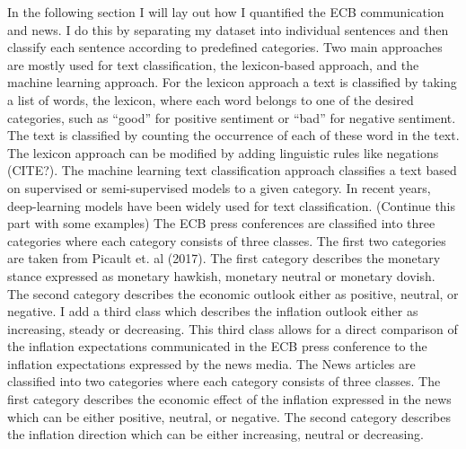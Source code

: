 \documentclass[review]{elsarticle}
\begin{document}
In the following section I will lay out how I quantified the ECB communication and news. I do this by separating my dataset into individual sentences and then classify each sentence according to predefined categories.
Two main approaches are mostly used for text classification, the lexicon-based approach, and the machine learning approach. For the lexicon approach a text is classified by taking a list of words, the lexicon, where each word belongs to one of the desired categories, such as “good” for positive sentiment or “bad” for negative sentiment. The text is classified by counting the occurrence of each of these word in the text. The lexicon approach can be modified by adding linguistic rules like negations (CITE?). 
The machine learning text classification approach classifies a text based on supervised or semi-supervised models to a given category. In recent years, deep-learning models have been widely used for text classification.
(Continue this part with some examples)
The ECB press conferences are classified into three categories where each category consists of three classes. The first two categories are taken from Picault et. al (2017). The first category describes the monetary stance expressed as monetary hawkish, monetary neutral or monetary dovish. The second category describes the economic outlook either as positive, neutral, or negative. I add a third class which describes the inflation outlook either as increasing, steady or decreasing. This third class allows for a direct comparison of the inflation expectations communicated in the ECB press conference to the inflation expectations expressed by the news media.
The News articles are classified into two categories where each category consists of three classes. The first category describes the economic effect of the inflation expressed in the news which can be either positive, neutral, or negative. The second category describes the inflation direction which can be either increasing, neutral or decreasing.
\end{document}
